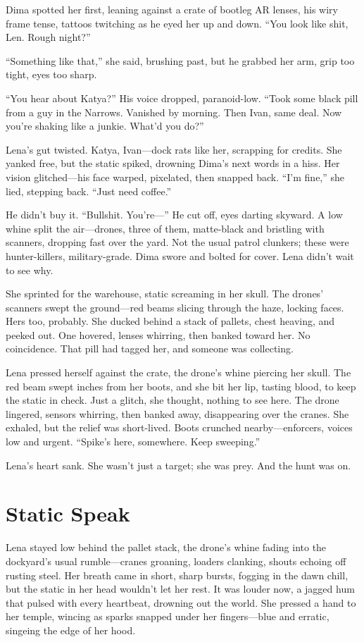 \documentclass[12pt]{book}
\begin{document}
Dima spotted her first, leaning against a crate of bootleg AR lenses, his wiry frame tense, tattoos twitching as he eyed her up and down. ``You look like shit, Len. Rough night?''

``Something like that,'' she said, brushing past, but he grabbed her arm, grip too tight, eyes too sharp.

``You hear about Katya?'' His voice dropped, paranoid-low. ``Took some black pill from a guy in the Narrows. Vanished by morning. Then Ivan, same deal. Now you're shaking like a junkie. What'd you do?''

Lena's gut twisted. Katya, Ivan---dock rats like her, scrapping for credits. She yanked free, but the static spiked, drowning Dima's next words in a hiss. Her vision glitched---his face warped, pixelated, then snapped back. ``I'm fine,'' she lied, stepping back. ``Just need coffee.''

He didn't buy it. ``Bullshit. You're---'' He cut off, eyes darting skyward. A low whine split the air---drones, three of them, matte-black and bristling with scanners, dropping fast over the yard. Not the usual patrol clunkers; these were hunter-killers, military-grade. Dima swore and bolted for cover. Lena didn't wait to see why.

She sprinted for the warehouse, static screaming in her skull. The drones' scanners swept the ground---red beams slicing through the haze, locking faces. Hers too, probably. She ducked behind a stack of pallets, chest heaving, and peeked out. One hovered, lenses whirring, then banked toward her. No coincidence. That pill had tagged her, and someone was collecting.

Lena pressed herself against the crate, the drone's whine piercing her skull. The red beam swept inches from her boots, and she bit her lip, tasting blood, to keep the static in check. Just a glitch, she thought, nothing to see here. The drone lingered, sensors whirring, then banked away, disappearing over the cranes. She exhaled, but the relief was short-lived. Boots crunched nearby---enforcers, voices low and urgent. ``Spike's here, somewhere. Keep sweeping.''

Lena's heart sank. She wasn't just a target; she was prey. And the hunt was on.

\section{Static Speak}

Lena stayed low behind the pallet stack, the drone’s whine fading into the dockyard’s usual rumble---cranes groaning, loaders clanking, shouts echoing off rusting steel. Her breath came in short, sharp bursts, fogging in the dawn chill, but the static in her head wouldn’t let her rest. It was louder now, a jagged hum that pulsed with every heartbeat, drowning out the world. She pressed a hand to her temple, wincing as sparks snapped under her fingers---blue and erratic, singeing the edge of her hood.
\end{document}
